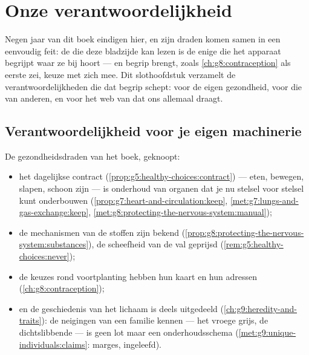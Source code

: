 \chapter{Onze verantwoordelijkheid}\label{ch:g9:our-responsibility}

Negen jaar van dit boek eindigen hier, en zijn draden komen samen
in een eenvoudig feit: de  die deze bladzijde kan lezen is de
enige  die het apparaat begrijpt waar ze bij hoort --- en
begrip brengt, zoals \cref{ch:g8:contraception} als eerste zei,
keuze met zich mee. Dit slothoofdstuk verzamelt de
verantwoordelijkheden die dat begrip schept: voor de eigen
gezondheid, voor die van anderen, en voor het web van  dat ons allemaal draagt.

\section{Verantwoordelijkheid voor je eigen machinerie}

\begin{proposition}\label{prop:g9:our-responsibility:self}
De gezondheidsdraden van het boek, geknoopt:
\begin{itemize}
  \item het dagelijkse contract
        (\cref{prop:g5:healthy-choices:contract}) --- eten,
        bewegen, slapen, schoon zijn --- is onderhoud van organen
        dat je nu stelsel voor stelsel kunt onderbouwen
        (\cref{prop:g7:heart-and-circulation:keep},
        \cref{met:g7:lungs-and-gas-exchange:keep},
        \cref{met:g8:protecting-the-nervous-system:manual});
  \item de mechanismen van de stoffen zijn bekend
        (\cref{prop:g8:protecting-the-nervous-system:substances}),
        de scheefheid van de val geprijsd
        (\cref{rem:g5:healthy-choices:never});
  \item de keuzes rond voortplanting hebben hun kaart en hun
        adressen (\cref{ch:g8:contraception});
  \item en de geschiedenis van het lichaam is deels uitgedeeld
        (\cref{ch:g9:heredity-and-traits}): de neigingen van een
        familie kennen --- het vroege grijs, de dichtslibbende
         --- is geen lot maar een onderhoudsschema
        (\cref{met:g9:unique-individuals:claims}: marges,
        ingeleefd).
\end{itemize}
\end{proposition}
\admitted

